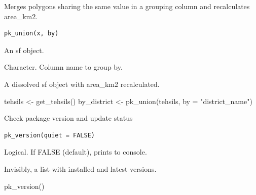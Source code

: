 \documentclass[a4paper]{book}
\begin{document}
%
\begin{Description}
Merges polygons sharing the same value in a grouping column and
recalculates area\_km2.
\end{Description}
%
\begin{Usage}
\begin{verbatim}
pk_union(x, by)
\end{verbatim}
\end{Usage}
%
\begin{Arguments}
\begin{ldescription}
\item[\code{x}] An sf object.

\item[\code{by}] Character. Column name to group by.
\end{ldescription}
\end{Arguments}
%
\begin{Value}
A dissolved sf object with area\_km2 recalculated.
\end{Value}
%
\begin{Examples}
\begin{ExampleCode}

  tehsils     <- get_tehsils()
  by_district <- pk_union(tehsils, by = "district_name")

\end{ExampleCode}
\end{Examples}
%
\begin{Description}
Check package version and update status
\end{Description}
%
\begin{Usage}
\begin{verbatim}
pk_version(quiet = FALSE)
\end{verbatim}
\end{Usage}
%
\begin{Arguments}
\begin{ldescription}
\item[\code{quiet}] Logical. If FALSE (default), prints to console.
\end{ldescription}
\end{Arguments}
%
\begin{Value}
Invisibly, a list with installed and latest versions.
\end{Value}
%
\begin{Examples}
\begin{ExampleCode}

pk_version()

\end{ExampleCode}
\end{Examples}
\printindex{}
\end{document}
